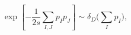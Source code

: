 \begin{equation}
\exp\left[-\frac{1}{2s}\sum_{I,J}p_Ip_J\right]\sim\delta_D\bigl(\sum_I p_I\bigr),
\label{cons}
\end{equation}

